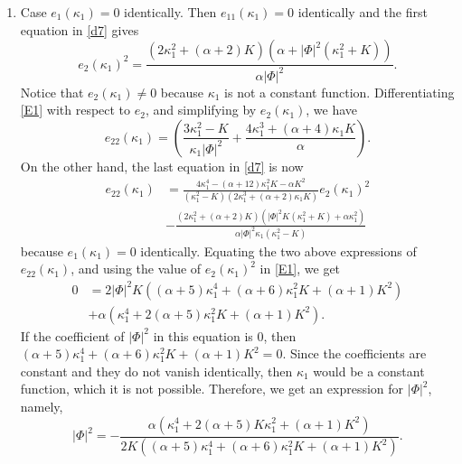 \documentclass[a4paper,12pt]{amsart}
\theoremstyle{definition}
\begin{document}
\begin{enumerate}
\item Case  $e_1(\kappa_1)=0$ identically. Then $e_{11}(\kappa_1)=0$ identically and the first equation in \eqref{d7} gives 
\begin{equation}\label{E1}
e_2(\kappa_1)^2=\frac{\left(2 \kappa_1^2+(\alpha +2) K\right) \left(\alpha +|\Phi|^2 \left(\kappa_1^2+K\right)\right)}{\alpha  |\Phi|^2}.
\end{equation}
Notice that $e_2(\kappa_1)\not=0$ because $\kappa_1$ is not a constant function. 
Differentiating \eqref{E1} with respect to $e_2$, and simplifying by $e_2(\kappa_1)$, we have
$$e_{22}(\kappa_1)=\left(\frac{3 \kappa_1^2-K}{\kappa_1|\Phi|^2}+\frac{4 \kappa_1^3+  (\alpha +4) \kappa_1 K}{\alpha }\right).$$
On the other hand, the last equation in \eqref{d7} is now 
\begin{equation*}
\begin{split}
e_{22}(\kappa_1)&=\frac{4 \kappa_1^4-(\alpha +12) \kappa_1^2 K-\alpha  K^2}{\left(\kappa_1^2-K\right) \left(2 \kappa_1^3+(\alpha +2) \kappa_1 K\right)}e_2(\kappa_1)^2 \\
 &-\frac{\left(2 \kappa_1^2+(\alpha +2) K\right) \left(|\Phi|^2 K \left(\kappa_1^2+K\right)+\alpha  \kappa_1^2\right)}{\alpha  |\Phi|^2 \kappa_1 \left(\kappa_1^2-K\right)}
 \end{split}
 \end{equation*}
 because $e_1(\kappa_1)=0$ identically. Equating the two above expressions of $e_{22}(\kappa_1)$, and using the value of $e_{2}(\kappa_1)^2$ in \eqref{E1}, we get 
\begin{equation*}
\begin{split}
0&=2 |\Phi|^2 K \left((\alpha +5) \kappa_1^4+(\alpha +6) \kappa_1^2 K+(\alpha +1) K^2\right)\\
&+\alpha  \left(\kappa_1^4+2 (\alpha +5) \kappa_1^2 K+(\alpha +1) K^2\right). 
\end{split}
 \end{equation*}
 If the coefficient of $|\Phi|^2$ in this equation is $0$, then $(\alpha +5) \kappa_1^4+(\alpha +6) \kappa_1^2 K+(\alpha +1) K^2=0$. Since the coefficients are constant and they do not vanish identically, then $\kappa_1$ would be a constant function, which it is not possible. Therefore, we get  an expression for $|\Phi|^2$, namely, 
\begin{equation}\label{d10}
|\Phi|^2=-\frac{\alpha  \left(\kappa_1^4+2 (\alpha +5) K\kappa_1^2 +(\alpha +1) K^2\right)}{2 K \left((\alpha +5) \kappa_1^4+(\alpha +6) \kappa_1^2 K+(\alpha +1) K^2\right)}.

\end{equation}
\end{enumerate}
\end{document}
